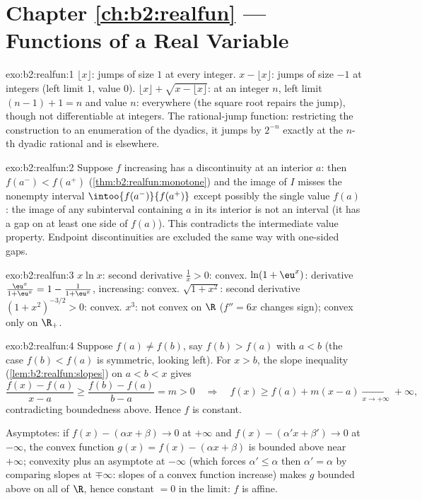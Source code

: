 \section*{Chapter \ref{ch:b2:realfun} --- Functions of a Real Variable}

\begin{solution}{exo:b2:realfun:1}
$\lfloor x\rfloor$: jumps of size $1$ at every integer. $x -
\lfloor x\rfloor$: jumps of size $-1$ at integers (left limit $1$,
value $0$). $\lfloor x\rfloor + \sqrt{x - \lfloor x\rfloor}$: at an
integer $n$, left limit $(n - 1) + 1 = n$ and value $n$:
\emph{} everywhere (the square root repairs the jump),
though not differentiable at integers. The rational-jump function:
restricting the construction to an enumeration of the dyadics, it
jumps by $2^{-n}$ exactly at the $n$-th dyadic rational and is
 elsewhere.
\end{solution}

\begin{solution}{exo:b2:realfun:2}
Suppose $f$ increasing has a discontinuity at an interior $a$: then
$f(a^-) < f(a^+)$ (\cref{thm:b2:realfun:monotone}) and the image
of $I$ misses the nonempty  interval
$\intoo{f(a^-)}{f(a^+)}$ except possibly the single value $f(a)$:
the image of any subinterval containing $a$ in its interior is not
an interval (it has a gap on at least one side of $f(a)$). This
contradicts the intermediate value property. Endpoint
discontinuities are excluded the same way with one-sided gaps.
\end{solution}

\begin{solution}{exo:b2:realfun:3}
$x\ln x$: second derivative $\frac1x > 0$: convex. $\ln(1 +
\eu^x)$: derivative $\frac{\eu^x}{1 + \eu^x} = 1 - \frac{1}{1 +
\eu^x}$, increasing: convex. $\sqrt{1 + x^2}$: second derivative
$(1 + x^2)^{-3/2} > 0$: convex. $x^3$: not convex on $\R$ ($f'' =
6x$ changes sign); convex only on $\R_+$.
\end{solution}

\begin{solution}{exo:b2:realfun:4}
Suppose $f(a) \neq f(b)$, say $f(b) > f(a)$ with $a < b$ (the case
$f(b) < f(a)$ is symmetric, looking left). For $x > b$, the slope
inequality (\cref{lem:b2:realfun:slopes}) on $a < b < x$ gives
\[
\frac{f(x) - f(a)}{x - a} \geq \frac{f(b) - f(a)}{b - a} = m > 0
\quad\Longrightarrow\quad
f(x) \geq f(a) + m(x - a) \xrightarrow[x\to+\infty]{} +\infty,
\]
contradicting boundedness above. Hence $f$ is constant.

Asymptotes: if $f(x) - (\alpha x + \beta) \to 0$ at $+\infty$ and
$f(x) - (\alpha' x + \beta') \to 0$ at $-\infty$, the convex
function $g(x) = f(x) - (\alpha x + \beta)$ is bounded above near
$+\infty$; convexity plus an asymptote at $-\infty$ (which forces
$\alpha' \leq \alpha$ then $\alpha' = \alpha$ by comparing slopes at
$\mp\infty$: slopes of a convex function increase) makes $g$
bounded above on all of $\R$, hence constant $= 0$ in the limit: $f$
is affine.
\end{solution}

